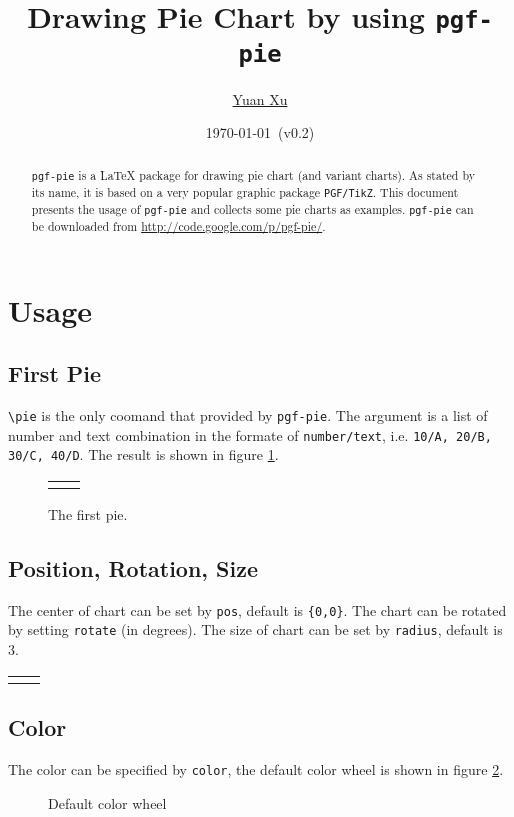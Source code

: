 \documentclass{article}
\newcommand{\demo}[2][1]{
  \begin{center}
  \begin{tabular}{cc}
    \begin{minipage}{.49\linewidth}
      \centering
      \resizebox{#1\linewidth}{!}{
        
      }
    \end{minipage}
    &
    \begin{minipage}{.45\linewidth}
      
    \end{minipage}
  \end{tabular}
  \end{center}
}
\begin{document}
\title{Drawing Pie Chart by using \texttt{pgf-pie}}
\author{\href{mailto:xuyuan.cn@gmail.com}{Yuan Xu}}
\date{\today{}~(v0.2)}
\maketitle

\begin{abstract}
  \texttt{pgf-pie} is a LaTeX package for drawing pie chart (and
  variant charts). As stated by its name, it is based on a very
  popular graphic package \texttt{PGF/TikZ}. This document presents
  the usage of \texttt{pgf-pie} and collects some pie charts as
  examples. \texttt{pgf-pie} can be downloaded from
  \href{http://code.google.com/p/pgf-pie/}{http://code.google.com/p/pgf-pie/}.
\end{abstract}

\tableofcontents

\section{Usage}

\subsection{First Pie}
\lstinline|\pie| is the only coomand that provided by
\texttt{pgf-pie}. The argument is a list of number and text
combination in the formate of \texttt{number/text}, i.e. \texttt{10/A,
  20/B, 30/C, 40/D}. The result is shown in figure \ref{fig:first-pie}.
\begin{figure}
  \centering
  \demo[0.6]{first-pie}
  \caption{The first pie.}
  \label{fig:first-pie}
\end{figure}

\subsection{Position, Rotation, Size}

The center of chart can be set by \texttt{pos}, default is
\texttt{\{0,0\}}. The chart can be rotated by setting \texttt{rotate}
(in degrees). The size of chart can be set by \texttt{radius}, default
is 3.

\demo{radius}

\subsection{Color}
The color can be specified by \texttt{color}, the default color wheel
is shown in figure \ref{fig:color-wheel}.
\begin{figure}
  \centering
  
  \caption{Default color wheel}
  \label{fig:color-wheel}
\end{figure}
\end{document}
